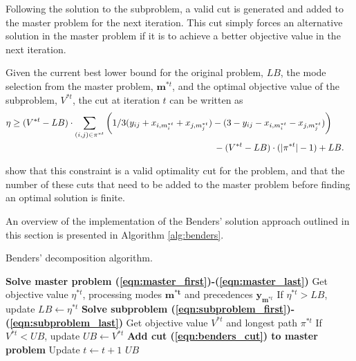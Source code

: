 \documentclass[a4paper,abstracton]{scrartcl}
\begin{document}
Following the solution to the subproblem, a valid cut is generated and added to the master problem for the next iteration. This cut simply forces an alternative solution in the master problem if it is to achieve a better objective value in the next iteration. 

Given the current best lower bound for the original problem, $LB$, the mode selection from the master problem, $\bm{m}^{*t}$, and the optimal objective value of the subproblem, $V^{*t}$, the cut at iteration $t$ can be written as
\begin{align}
	& \eta \geq (V^{*t} - LB)\cdot\sum_{(i,j)\in \pi^{*t}}\bigg(1/3 (y_{ij} + x_{i,m_i^{*t}} + x_{j,m_j^{*t}}) - (3 - y_{ij} - x_{i,m_i^{*t}} - x_{j,m_j^{*t}})\bigg) & \nonumber \\
	& \hspace{8.1cm} - (V^{*t} - LB)\cdot(|\pi^{*t}|-1) + LB.\label{eqn:benders_cut}
\end{align}

\cite{balouka2021robust} show that this constraint is a valid optimality cut for the problem, and that the number of these cuts that need to be added to the master problem before finding an optimal solution is finite.

An overview of the implementation of the Benders' solution approach outlined in this section is presented in Algorithm \ref{alg:benders}.

\begin{algorithm}[h] 
\caption{Benders' decomposition algorithm.}
\begin{algorithmic}[1]
	\State \textbf{Solve master problem (\ref{eqn:master_first})-(\ref{eqn:master_last})} 
	\State \hspace{\algorithmicindent} Get objective value $\eta^{*t}$, processing modes $\bm{m^{*t}}$ and precedences $\bm{y}_{\bm{m}^{*t}}$
	\State \hspace{\algorithmicindent} If $\eta^{*t}>LB$, update $LB\leftarrow \eta^{*t}$ 
	\State \textbf{Solve subproblem (\ref{eqn:subproblem_first})-(\ref{eqn:subproblem_last})}
	\State \hspace{\algorithmicindent} Get objective value $V^{*t}$ and longest path $\pi^{*t}$
	\State \hspace{\algorithmicindent} If $V^{*t}<UB$, update $UB\leftarrow V^{*t}$
	\State \textbf{Add cut (\ref{eqn:benders_cut}) to master problem}
	\State Update $t\leftarrow t+1$
\EndWhile
\State \Return $UB$
\end{algorithmic}
\label{alg:benders}
\end{algorithm}
\end{document}
